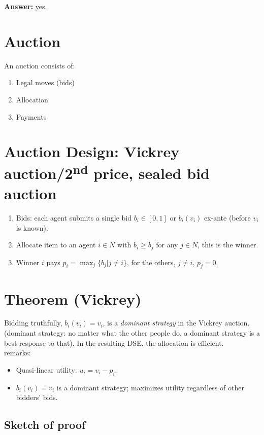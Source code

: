 \documentclass{article}
\begin{document}
\noindent
\textbf{Answer:} yes.

\section*{Auction}
An auction consists of:
\begin{enumerate}
    \item Legal moves (bids)
    \item Allocation
    \item Payments
\end{enumerate}

\section*{Auction Design: Vickrey auction/2\textsuperscript{nd} price, sealed bid auction}


\begin{enumerate}
    \item Bids: each agent submits a single bid $b_i\in[0,1]$ or $b_i(v_i)$ ex-ante (before $v_i$ is known).
    \item Allocate item to an agent $i\in N$ with $b_i\geq b_j$ for any $j\in N$, this is the winner.
    \item Winner $i$ pays $p_i=\max_j \{b_j|j\neq i\}$, for the others, $j\neq i$,  $p_j=0$.
\end{enumerate}

\section*{Theorem (Vickrey)}
Bidding truthfully, $b_i(v_i)=v_i$, is a \textit{dominant strategy} in the Vickrey auction. (dominant strategy: no matter what the other people do, a dominant strategy is a best response to that). In the resulting DSE, the allocation is efficient.\\

 remarks:
\begin{itemize}
    \item Quasi-linear utility: $u_i=v_i-p_i$.
    \item $b_i(v_i)=v_i$ is a dominant strategy; maximizes utility regardless of other bidders' bids.
\end{itemize}

\subsection*{Sketch of proof}
\end{document}
